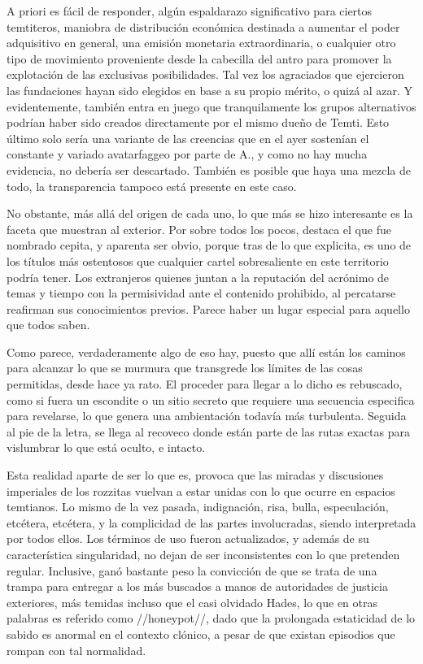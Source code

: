 \documentclass[
  spanish,
]{book}
\begin{document}
A priori es fácil de responder, algún espaldarazo significativo para ciertos temtiteros, maniobra de distribución económica destinada a aumentar el poder adquisitivo en general, una emisión monetaria extraordinaria, o cualquier otro tipo de movimiento proveniente desde la cabecilla del antro para promover la explotación de las exclusivas posibilidades. Tal vez los agraciados que ejercieron las fundaciones hayan sido elegidos en base a su propio mérito, o quizá al azar. Y evidentemente, también entra en juego que tranquilamente los grupos alternativos podrían haber sido creados directamente por el mismo dueño de Temti. Esto último solo sería una variante de las creencias que en el ayer sostenían el constante y variado avatarfaggeo por parte de A., y como no hay mucha evidencia, no debería ser descartado. También es posible que haya una mezcla de todo, la transparencia tampoco está presente en este caso.

No obstante, más allá del origen de cada uno, lo que más se hizo interesante es la faceta que muestran al exterior. Por sobre todos los pocos, destaca el que fue nombrado cepita, y aparenta ser obvio, porque tras de lo que explicita, es uno de los títulos más ostentosos que cualquier cartel sobresaliente en este territorio podría tener. Los extranjeros quienes juntan a la reputación del acrónimo de temas y tiempo con la permisividad ante el contenido prohibido, al percatarse reafirman sus conocimientos previos. Parece haber un lugar especial para aquello que todos saben.

Como parece, verdaderamente algo de eso hay, puesto que allí están los caminos para alcanzar lo que se murmura que transgrede los límites de las cosas permitidas, desde hace ya rato. El proceder para llegar a lo dicho es rebuscado, como si fuera un escondite o un sitio secreto que requiere una secuencia especifica para revelarse, lo que genera una ambientación todavía más turbulenta. Seguida al pie de la letra, se llega al recoveco donde están parte de las rutas exactas para vislumbrar lo que está oculto, e intacto.

Esta realidad aparte de ser lo que es, provoca que las miradas y discusiones imperiales de los rozzitas vuelvan a estar unidas con lo que ocurre en espacios temtianos. Lo mismo de la vez pasada, indignación, risa, bulla, especulación, etcétera, etcétera, y la complicidad de las partes involucradas, siendo interpretada por todos ellos. Los términos de uso fueron actualizados, y además de su característica singularidad, no dejan de ser inconsistentes con lo que pretenden regular. Inclusive, ganó bastante peso la convicción de que se trata de una trampa para entregar a los más buscados a manos de autoridades de justicia exteriores, más temidas incluso que el casi olvidado Hades, lo que en otras palabras es referido como //honeypot//, dado que la prolongada estaticidad de lo sabido es anormal en el contexto clónico, a pesar de que existan episodios que rompan con tal normalidad.
\end{document}
